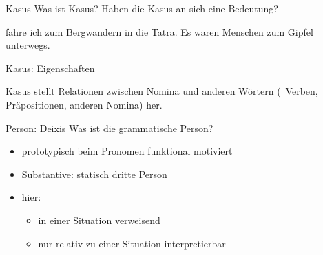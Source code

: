 \begin{frame}
  {Kasus}
  \pause
  Was ist Kasus? Haben die Kasus an sich eine Bedeutung?
  \Halbzeile
  \pause
  \begin{exe}
    \ex
    \begin{xlist}
      \pause
      \pause
      \pause
    \end{xlist}
    \pause
    \ex
    \begin{xlist}
      \ex {} fahre ich zum Bergwandern in die Tatra.
      \ex Es waren  Menschen zum Gipfel unterwegs.
    \end{xlist}
    \pause
    \ex
    \begin{xlist}
      \pause
      \pause
      \pause
    \end{xlist}
  \end{exe}
\end{frame}


\begin{frame}
  {Kasus: Eigenschaften}
  \pause
  \centering

  \Large Kasus stellt Relationen zwischen Nomina und anderen Wörtern (\zB\ Verben, Präpositionen, anderen Nomina) her.\\
\end{frame}

\begin{frame}
  {Person: Deixis}
  \pause
  Was ist die grammatische Person?

  \Halbzeile
  \pause
  \begin{exe}
    \ex
    \begin{xlist}
      \pause
      \pause
      \pause
    \end{xlist}
  \end{exe}
  \pause
  \Halbzeile
  \begin{itemize}[<+->]
    \item prototypisch beim \alert{Pronomen} funktional motiviert
    \item Substantive: statisch dritte Person
      \Halbzeile
    \item hier: 
      \begin{itemize}[<+->]
        \item in einer Situation verweisend
        \item nur relativ zu einer Situation interpretierbar
      \end{itemize} 
  \end{itemize}
\end{frame}

